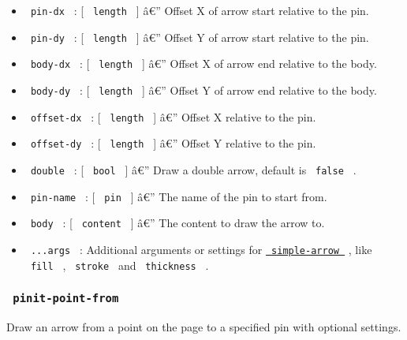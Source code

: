 \begin{itemize}
\tightlist
\item
  \texttt{\ pin-dx\ } : {[} \texttt{\ length\ } {]} â€'' Offset X of
  arrow start relative to the pin.
\item
  \texttt{\ pin-dy\ } : {[} \texttt{\ length\ } {]} â€'' Offset Y of
  arrow start relative to the pin.
\item
  \texttt{\ body-dx\ } : {[} \texttt{\ length\ } {]} â€'' Offset X of
  arrow end relative to the body.
\item
  \texttt{\ body-dy\ } : {[} \texttt{\ length\ } {]} â€'' Offset Y of
  arrow end relative to the body.
\item
  \texttt{\ offset-dx\ } : {[} \texttt{\ length\ } {]} â€'' Offset X
  relative to the pin.
\item
  \texttt{\ offset-dy\ } : {[} \texttt{\ length\ } {]} â€'' Offset Y
  relative to the pin.
\item
  \texttt{\ double\ } : {[} \texttt{\ bool\ } {]} â€'' Draw a double
  arrow, default is \texttt{\ false\ } .
\item
  \texttt{\ pin-name\ } : {[} \texttt{\ pin\ } {]} â€'' The name of the
  pin to start from.
\item
  \texttt{\ body\ } : {[} \texttt{\ content\ } {]} â€'' The content to
  draw the arrow to.
\item
  \texttt{\ ...args\ } : Additional arguments or settings for
  \href{https://github.com/typst/packages/raw/main/packages/preview/pinit/0.2.2/\#simple-arrow}{\texttt{\ simple-arrow\ }}
  , like \texttt{\ fill\ } , \texttt{\ stroke\ } and
  \texttt{\ thickness\ } .
\end{itemize}

\subsubsection{\texorpdfstring{\texttt{\ pinit-point-from\ }}{ pinit-point-from }}\label{pinit-point-from}

Draw an arrow from a point on the page to a specified pin with optional
settings.

\begin{Shaded}
\begin{Highlighting}[]
\end{Highlighting}
\end{Shaded}

